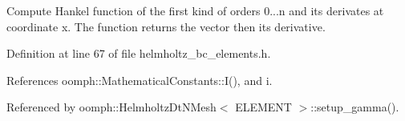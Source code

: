 Compute Hankel function of the first kind of orders 0...n and its derivates at coordinate x. The function returns the vector then its derivative. 

Definition at line 67 of file helmholtz\+\_\+bc\+\_\+elements.\+h.



References oomph\+::\+Mathematical\+Constants\+::\+I(), and i.



Referenced by oomph\+::\+Helmholtz\+Dt\+N\+Mesh$<$ E\+L\+E\+M\+E\+N\+T $>$\+::setup\+\_\+gamma().

